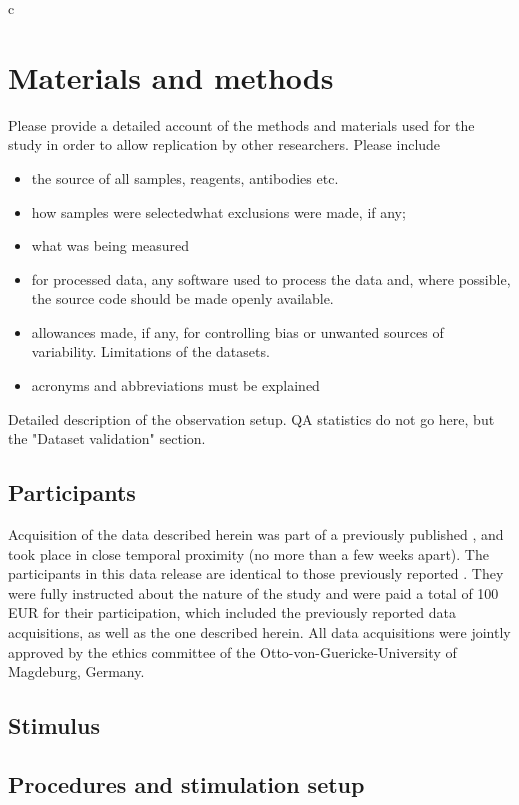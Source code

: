 c\section*{Materials and methods} 
Please provide a detailed account of the methods and materials used for the study in order to allow replication by other researchers.
Please include \begin{itemize}
\item 
the source of all samples, reagents, antibodies etc.
\item 
 how samples were selectedwhat exclusions were made, if any;
\item 
what was being measured
\item 
for processed data, any software used to process the data and, where possible, the source code should be made openly available.\item 

allowances made, if any, for controlling bias or unwanted sources of variability.
Limitations of the datasets.\item 

acronyms and abbreviations must be explained
\end{itemize}

Detailed description of the observation setup. QA statistics do not go here, but the "Dataset validation" section.

\subsection*{Participants}

Acquisition of the data described herein was part of a previously published
\cite{Hanke_2014}, and took place in close temporal proximity (no more than a
few weeks apart). The participants in this data release are identical to those
previously reported \cite{Hanke_2014}.  They were fully instructed about the
nature of the study and were paid a total of 100 EUR for their participation,
which included the previously reported data acquisitions, as well as the one
described herein. All data acquisitions were jointly approved by the ethics
committee of the Otto-von-Guericke-University of Magdeburg, Germany.


\subsection*{Stimulus}

\subsection*{Procedures and stimulation setup}

